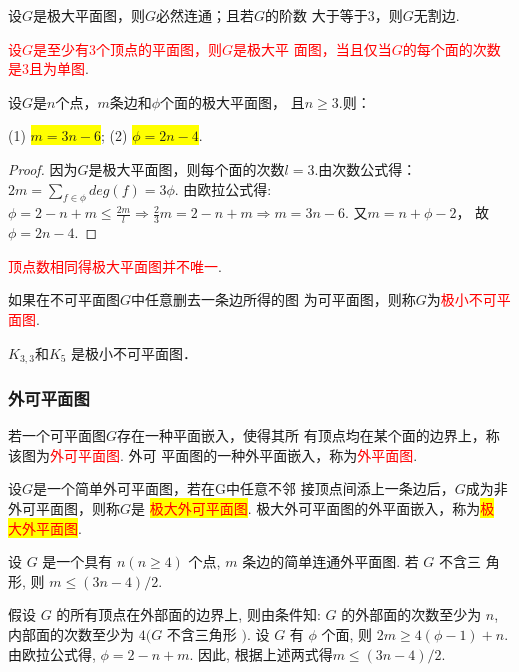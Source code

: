 \begin{lemma}
设$G$是极大平面图，则$G$必然连通；且若$G$的阶数
大于等于$3$，则$G$无割边.
\end{lemma}

\begin{theorem}
	\textcolor{red}{设$G$是至少有3个顶点的平面图，则$G$是极大平
	面图，当且仅当$G$的每个面的次数是$3$且为单图}.
\end{theorem}

\begin{corollary}
	设$G$是$n$个点，$m$条边和$\phi$个面的极大平面图，
且$n\geq 3$.则：

(1) \colorbox{yellow}{$m=3n-6$}; (2) \colorbox{yellow}{$\phi=2n-4$}.
\end{corollary}
\begin{proof}
	因为$G$是极大平面图，则每个面的次数$l =3$.由次数公式得：
	$2m = \sum\limits_{f \in \phi} deg(f)= 3\phi$. 由欧拉公式得:$\phi = 2-n+m\leq \frac{2m}{l}\Rightarrow \frac{2}{3} m=2-n+m\Rightarrow m = 3n-6$. 又$m=n+\phi -2$， 故$\phi=2n-4$.
\end{proof}
\begin{note}
	\textcolor{red}{顶点数相同得极大平面图并不唯一}.
\end{note}

\begin{definition}
	如果在不可平面图$G$中任意删去一条边所得的图
	为可平面图，则称$G$为\textcolor{red}{极小不可平面图}.
\end{definition}
\begin{note}
	$K_{3,3}$和$K_5$ 是极小不可平面图．
\end{note}



\subsubsection{外可平面图}
\begin{definition}
若一个可平面图$G$存在一种平面嵌入，使得其所
有顶点均在某个面的边界上，称该图为\textcolor{red}{外可平面图}. 外可
平面图的一种外平面嵌入，称为\textcolor{red}{外平面图}.


设$G$是一个简单外可平面图，若在G中任意不邻
接顶点间添上一条边后，$G$成为非外可平面图，则称$G$是
\colorbox{yellow}{\textcolor{red}{极大外可平面图}}. 极大外可平面图的外平面嵌入，称为\colorbox{yellow}{\textcolor{red}{极
大外平面图}}.
\end{definition}

\begin{example}
	设 \( G \) 是一个具有 \( n(n \geq 4) \) 个点, \( m \) 条边的简单连通外平面图. 若 \( G \) 不含三 角形, 则 \( m \leq(3 n-4) / 2 \).
	
	\noindent {\bfseries\songti \textcolor{ecolor}{解：}} 假设 \( G \) 的所有顶点在外部面的边界上, 则由条件知: \( G \) 的外部面的次数至少为 \( n \), 内部面的次数至少为 \( 4(G \) 不含三角形 \( ) \). 设 \( G \) 有 \( \phi \) 个面, 则 $2m \geq 4(\phi-1)+n$. 由欧拉公式得, $\phi=2-n+m$. 因此, 根据上述两式得\( m \leq(3 n-4) / 2 \).
\end{example}

